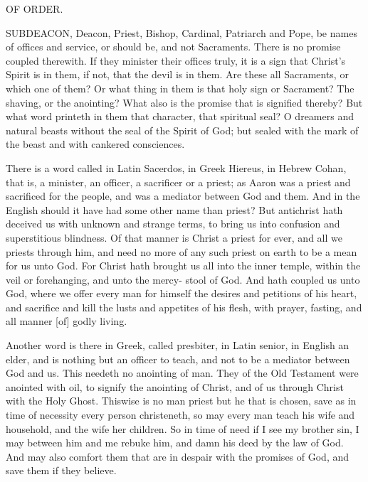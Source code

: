 OF ORDER. 

SUBDEACON, Deacon, Priest, Bishop, Cardinal, 
Patriarch and Pope, be names of offices and service, or 
should be, and not Sacraments. There is no promise 
coupled therewith. If they minister their offices truly, it 
is a sign that Christ's Spirit is in them, if not, that the 
devil is in them. Are these all Sacraments, or which one 
of them? Or what thing in them is that holy sign or Sacrament?
The shaving, or the anointing? What also is 
the promise that is signified thereby? But what word 
printeth in them that character, that spiritual seal? O 
dreamers and natural beasts without the seal of the Spirit 
of God; but sealed with the mark of the beast and with 
cankered consciences. 

There is a word called in Latin Sacerdos, in Greek 
Hiereus, in Hebrew Cohan, that is, a minister, an officer, 
a sacrificer or a priest; as Aaron was a priest and sacrificed 
for the people, and was a mediator between God and them. 
And in the English should it have had some other name 
than priest? But antichrist hath deceived us with unknown
and strange terms, to bring us into confusion and 
superstitious blindness. Of that manner is Christ a 
priest for ever, and all we priests through him, and need no 
more of any such priest on earth to be a mean for us 
unto God. For Christ hath brought us all into the inner 
temple, within the veil or forehanging, and unto the mercy- 
stool of God. And hath coupled us unto God, where 
we offer every man for himself the desires and petitions of 
his heart, and sacrifice and kill the lusts and appetites of 
his flesh, with prayer, fasting, and all manner [of] godly 
living. 

Another word is there in Greek, called presbiter, in 
Latin senior, in English an elder, and is nothing but an 
officer to teach, and not to be a mediator between God 
and us. This needeth no anointing of man. They of 
the Old Testament were anointed with oil, to signify the 
anointing of Christ, and of us through Christ with the 
Holy Ghost. Thiswise is no man priest but he that is 
chosen, save as in time of necessity every person christeneth,
so may every man teach his wife and household, and 
the wife her children. So in time of need if I see my 
brother sin, I may between him and me rebuke him, and 
damn his deed by the law of God. And may also comfort
them that are in despair with the promises of God, 
and save them if they believe. 

